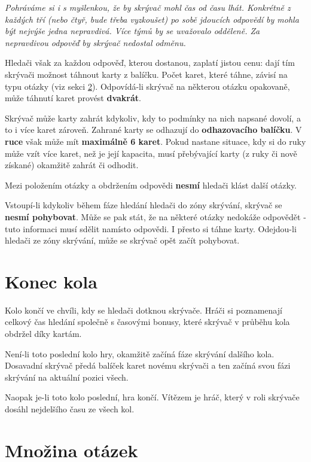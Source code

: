 \documentclass{book}
\newenvironment{reasoning}{\begin{small}\itshape}{\end{small}}
\begin{document}
\begin{reasoning}
	Pohráváme si i s myšlenkou, že by skrývač mohl čas od času lhát. Konkrétně z každých tří (nebo čtyř, bude třeba vyzkoušet) po sobě jdoucích odpovědí by mohla být nejvýše jedna nepravdivá. Více týmů by se uvažovalo odděleně. Za nepravdivou odpověď by skrývač nedostal odměnu.
\end{reasoning}

Hledači však za každou odpověď, kterou dostanou, zaplatí jistou cenu: dají tím skrývači možnost táhnout karty z balíčku. Počet karet, které táhne, závisí na typu otázky (viz sekci \ref{otázky}). Odpovídá-li skrývač na některou otázku opakovaně, může táhnutí karet provést \textbf{dvakrát}.

Skrývač může karty zahrát kdykoliv, kdy to podmínky na nich napsané dovolí, a to i více karet zároveň. Zahrané karty se odhazují do \textbf{odhazovacího balíčku}. V \textbf{ruce} však může mít \textbf{maximálně 6 karet}. Pokud nastane situace, kdy si do ruky může vzít více karet, než je její kapacita, musí přebývající karty (z ruky či nově získané) okamžitě zahrát či odhodit.

Mezi položením otázky a obdržením odpovědi \textbf{nesmí} hledači klást další otázky.

Vstoupí-li kdykoliv během fáze hledání hledači do zóny skrývání, skrývač se \textbf{nesmí pohybovat}. Může se pak stát, že na některé otázky nedokáže odpovědět - tuto informaci musí sdělit namísto odpovědi. I přesto si táhne karty. Odejdou-li hledači ze zóny skrývání, může se skrývač opět začít pohybovat.

\section{Konec kola}

Kolo končí ve chvíli, kdy se hledači dotknou skrývače. Hráči si poznamenají celkový čas hledání společně s časovými bonusy, které skrývač v průběhu kola obdržel díky kartám.

Není-li toto poslední kolo hry, okamžitě začíná fáze skrývání dalšího kola. Dosavadní skrývač předá balíček karet novému skrývači a ten začíná svou fázi skrývání na aktuální pozici všech.

Naopak je-li toto kolo poslední, hra končí. Vítězem je hráč, který v roli skrývače dosáhl nejdelšího času ze všech kol.

\section{Množina otázek}\label{otázky}
\end{document}
